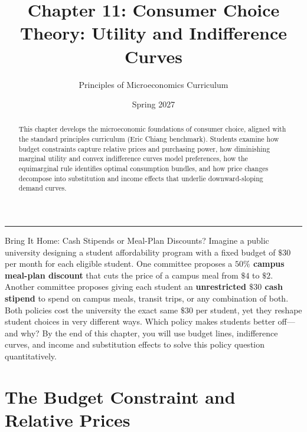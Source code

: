 \documentclass[11pt,letterpaper]{article}
\begin{document}
\title{\Huge\bfseries\color{SlateBlue} Chapter 11: Consumer Choice Theory: Utility and Indifference Curves}
\author{\large Principles of Microeconomics Curriculum}
\date{Spring 2027}
\maketitle

\thispagestyle{plain}

\begin{abstract}
This chapter develops the microeconomic foundations of consumer choice, aligned with the standard principles curriculum (Eric Chiang benchmark). Students examine how budget constraints capture relative prices and purchasing power, how diminishing marginal utility and convex indifference curves model preferences, how the equimarginal rule identifies optimal consumption bundles, and how price changes decompose into substitution and income effects that underlie downward-sloping demand curves.
\end{abstract}

\tableofcontents
\vspace{1.5em}
\hrule
\vspace{1.5em}

\begin{examplecase}{Bring It Home: Cash Stipends or Meal-Plan Discounts?}
Imagine a public university designing a student affordability program with a fixed budget of $\$30$ per month for each eligible student. One committee proposes a \textbf{$50\%$ campus meal-plan discount} that cuts the price of a campus meal from $\$4$ to $\$2$. Another committee proposes giving each student an \textbf{unrestricted $\$30$ cash stipend} to spend on campus meals, transit trips, or any combination of both. Both policies cost the university the exact same $\$30$ per student, yet they reshape student choices in very different ways. Which policy makes students better off—and why? By the end of this chapter, you will use budget lines, indifference curves, and income and substitution effects to solve this policy question quantitatively.
\end{examplecase}

\section{The Budget Constraint and Relative Prices}
\end{document}
